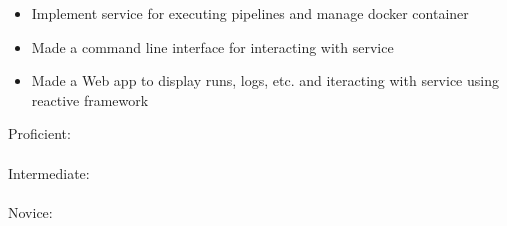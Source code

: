 \documentclass[10pt,a4paper,ragged2e,withhyper]{altacv}
\begin{document}
\begin{paracol}{2}
\begin{itemize}
\item Implement service for executing pipelines and manage docker container
\item Made a command line interface for interacting with service
\item Made a Web app to display runs, logs, etc. and iteracting with service using reactive framework
\end{itemize}











\switchcolumn





Proficient: 
 \\
\divider \\
Intermediate:
 \\
\divider \\
Novice:


\end{paracol}
\end{document}

